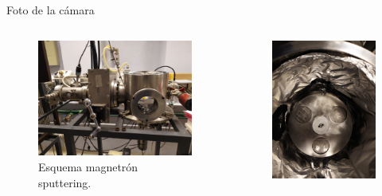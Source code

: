 \documentclass[11pt]{beamer}
\begin{document}
		\begin{frame}{Foto de la cámara}
			\begin{columns}[T]
				\begin{column}{.49\textwidth}
					\begin{figure}[H]
					\centering
					\includegraphics[scale=0.04]{img/camara.jpg}
					\caption{Esquema magnetrón sputtering.}
					\end{figure}
				\end{column}
				\begin{column}{.49\textwidth}
					\begin{figure}[H]
					\includegraphics[scale=0.04]{img/muestras.jpg}

\end{figure}
\end{column}
\end{columns}
\end{frame}
\end{document}
